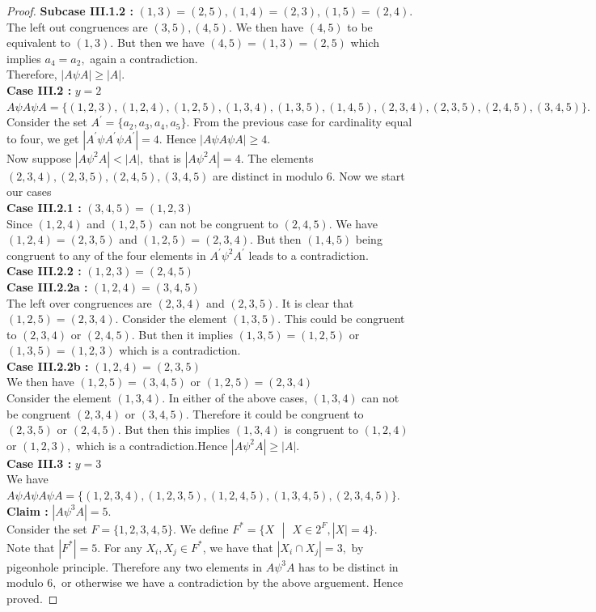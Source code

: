 \documentclass[reqno,10pt]{amsart}
\begin{document}
\begin{proof}
\textbf{Subcase III.1.2 :} $ (1,3)=(2,5), (1,4)=(2,3), (1,5)=(2,4).$\\ The left out congruences are $(3,5),(4,5).$ We then have $(4,5)$ to be equivalent to $(1,3).$ But then we have $(4,5)=(1,3)=(2,5)$ which implies $a_4=a_2,$ again a contradiction.\\
Therefore, $|A \psi A| \geq |A|. $\\
\textbf{Case III.2 : } $y=2$  \\
$ A \psi A \psi A = \{ (1,2,3),(1,2,4),(1,2,5),(1,3,4),(1,3,5),(1,4,5),(2,3,4),(2,3,5),(2,4,5),(3,4,5) \} .$ Consider the set $ A^{'} = \{a_2,a_3,a_4,a_5 \}.$ From the previous case for cardinality equal to four, we get $|A^{'} \psi A^{'} \psi A^{'}|=4.$ Hence $|A \psi A \psi A| \geq 4$. \\
Now suppose $| A \psi^2 A| < |A|,$ that is $|A \psi^2 A| = 4.$
The elements $(2,3,4),(2,3,5),(2,4,5),(3,4,5)$ are distinct in modulo $6.$ Now we start our cases\\
\textbf{Case III.2.1 :} $(3,4,5) = (1,2,3)$ \\ 
Since $(1,2,4)$ and $(1,2,5)$ can not be congruent to $(2,4,5).$ We have $(1,2,4)=(2,3,5)$ and $(1,2,5) = (2,3,4).$ But then $(1,4,5)$ being congruent to any of the four elements in $A^{'} \psi^2 A^{'}$ leads to a contradiction.\\
\textbf{Case III.2.2 :} $(1,2,3) = (2,4,5)$\\
\textbf{Case III.2.2a :} $(1,2,4) = (3,4,5)$\\
 The left over congruences are $(2,3,4)$ and $(2,3,5).$ It is clear that $(1,2,5) = (2,3,4).$ Consider the element $(1,3,5).$ This could be congruent to $(2,3,4)$ or $(2,4,5).$ But then it implies $(1,3,5)=(1,2,5)$ or $(1,3,5)  = (1,2,3)$ which is a contradiction.\\
 \textbf{Case III.2.2b :} $(1,2,4)=(2,3,5)$\\
 We then have $(1,2,5) = (3,4,5)$ or $(1,2,5) = (2,3,4)$ \\ 
Consider the element $(1,3,4)$. In either of the above cases, $(1,3,4)$ can not be congruent $(2,3,4)$ or $(3,4,5).$ Therefore it could be congruent to $(2,3,5)$ or $(2,4,5).$ But then this implies $(1,3,4)$ is congruent to $(1,2,4)$ or $(1,2,3),$ which is a contradiction.Hence $ |A \psi^2 A| \geq |A|. $\\
\textbf{Case III.3 :} $y=3$ \\
We have $A \psi A \psi A \psi A = \{(1,2,3,4),(1,2,3,5),(1,2,4,5),(1,3,4,5),(2,3,4,5)  \} .$\\ 
\textbf{Claim :} $|A \psi^3 A|=5.$\\
Consider the set $ F = \{1,2,3,4,5\}.$ We define $ F^* = \{ X \text{  } | \text{  } X \in 2^F , |X|=4 \}. $\\
Note that $|F^*|=5$. For any $X_i,X_j \in F^*$, we have that $ |X_i \cap X_j| = 3,$ by pigeonhole principle. Therefore any two elements in $A \psi ^3 A$ has to be distinct in modulo $6,$ or otherwise we have a contradiction by the above arguement. Hence proved.
\end{proof}
\end{document}
